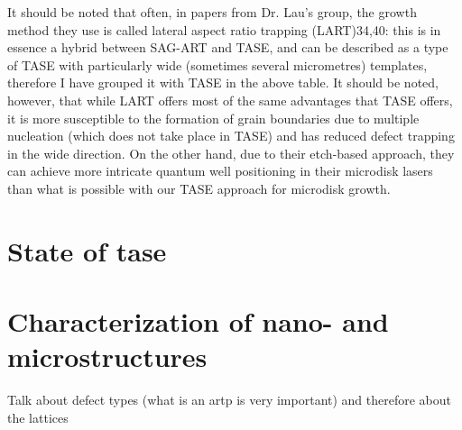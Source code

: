 It should be noted that often, in papers from Dr. Lau’s group, the growth method they use is called lateral aspect ratio trapping (LART)34,40: this is in essence a hybrid between SAG-ART and TASE, and can be described as a type of TASE with particularly wide (sometimes several micrometres) templates, therefore I have grouped it with TASE in the above table. It should be noted, however, that while LART offers most of the same advantages that TASE offers, it is more susceptible to the formation of grain boundaries due to multiple nucleation (which does not take place in TASE) and has reduced defect trapping in the wide direction. On the other hand, due to their etch-based approach, they can achieve more intricate quantum well positioning in their microdisk lasers than what is possible with our TASE approach for microdisk growth.

\section{\texorpdfstring{State of \acl{tase}}{State of template assisted selective epitaxy}}
\section{Characterization of nano- and microstructures}
Talk about defect types (what is an artp is very important) and therefore about the lattices